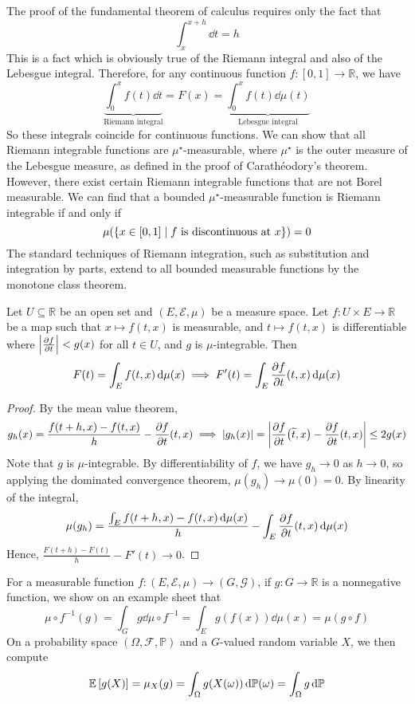 \begin{remark}
	The proof of the fundamental theorem of calculus requires only the fact that
	\[ \int_x^{x + h} \dd{t} = h \]
	This is a fact which is obviously true of the Riemann integral and also of the Lebesgue integral.
	Therefore, for any continuous function \( f \colon [0,1] \to \mathbb R \), we have
	\[ \underbrace{\int_0^x f(t) \dd{t}}_{\text{Riemann integral}} = F(x) = \underbrace{\int_0^x f(t) \dd{\mu(t)}}_{\text{Lebesgue integral}} \]
	So these integrals coincide for continuous functions.
	We can show that all Riemann integrable functions are \( \mu^\star \)-measurable, where \( \mu^\star \) is the outer measure of the Lebesgue measure, as defined in the proof of Carath\'eodory's theorem.
	However, there exist certain Riemann integrable functions that are not Borel measurable.
	We can find that a bounded \( \mu^\star \)-measurable function is Riemann integrable if and only if
	\[ \mu\qty(\qty{x \in [0,1] \mid f \text{ is discontinuous at } x}) = 0 \]
	The standard techniques of Riemann integration, such as substitution and integration by parts, extend to all bounded measurable functions by the monotone class theorem.
\end{remark}
\begin{theorem}
	Let \( U \subseteq \mathbb R \) be an open set and \( (E, \mathcal E, \mu) \) be a measure space.
	Let \( f \colon U \times E \to \mathbb R \) be a map such that \( x \mapsto f(t, x) \) is measurable, and \( t \mapsto f(t,x) \) is differentiable where \( \abs{\pdv{f}{t}} < g(x) \) for all \( t \in U \), and \( g \) is \( \mu \)-integrable.
	Then
	\[ F(t) = \int_E f(t,x) \dd{\mu(x)} \implies F'(t) = \int_E \pdv{f}{t}\qty(t,x) \dd{\mu(x)} \]
\end{theorem}
\begin{proof}
	By the mean value theorem,
	\[ g_h(x) = \frac{f(t + h, x) - f(t, x)}{h} - \pdv{f}{t}\qty(t,x) \implies \abs{g_h(x)} = \abs{\pdv{f}{t}\qty(\widetilde t, x) - \pdv{f}{t}\qty(t, x)} \leq 2g(x) \]
	Note that \( g \) is \( \mu \)-integrable.
	By differentiability of \( f \), we have \( g_h \to 0 \) as \( h \to 0 \), so applying the dominated convergence theorem, \( \mu(g_h) \to \mu(0) = 0 \).
	By linearity of the integral,
	\[ \mu(g_h) = \frac{\int_E f(t + h, x) - f(t, x) \dd{\mu(x)}}{h} - \int_E \pdv{f}{t}\qty(t,x) \dd{\mu(x)} \]
	Hence, \( \frac{F(t+h) - F(t)}{h} - F'(t) \to 0 \).
\end{proof}
\begin{example}
	For a measurable function \( f \colon (E, \mathcal E, \mu) \to (G, \mathcal G) \), if \( g \colon G \to \mathbb R \) is a nonnegative function, we show on an example sheet that
	\[ \mu \circ f^{-1}(g) = \int_G g \dd{\mu\circ f^{-1}} = \int_E g(f(x)) \dd{\mu(x)} = \mu(g \circ f) \]
	On a probability space \( (\Omega, \mathcal F, \mathbb P) \) and a \( G \)-valued random variable \( X \), we then compute
	\[ \mathbb{E}\left[{g(X)}\right] = \mu_X(g) = \int_\Omega g(X(\omega)) \dd{\mathbb P(\omega)} = \int_\Omega g \dd{\mathbb {P}} \]
\end{example}
